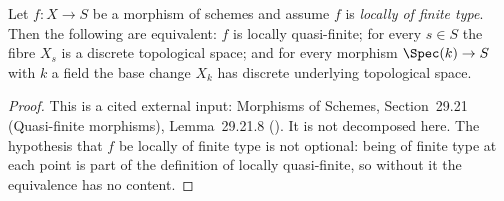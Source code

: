 \begin{lemma}
\label{lem:pc-locally-quasi-finite-discrete-fibres}
Let $f:X\to S$ be a morphism of schemes and assume $f$ is \emph{locally of
finite type}.  Then the following are equivalent: $f$ is locally quasi-finite;
for every $s\in S$ the fibre $X_s$ is a discrete topological space; and for
every morphism $\Spec(k)\to S$ with $k$ a field the base change $X_k$ has
discrete underlying topological space.
\end{lemma}
\begin{proof}
This is a cited external input: Morphisms of Schemes, Section~29.21
(Quasi-finite morphisms), Lemma~29.21.8 ().  It is not
decomposed here.  The hypothesis that $f$ be locally of finite type is not
optional: being of finite type at each point is part of the definition of
locally quasi-finite, so without it the equivalence has no content.
\end{proof}

